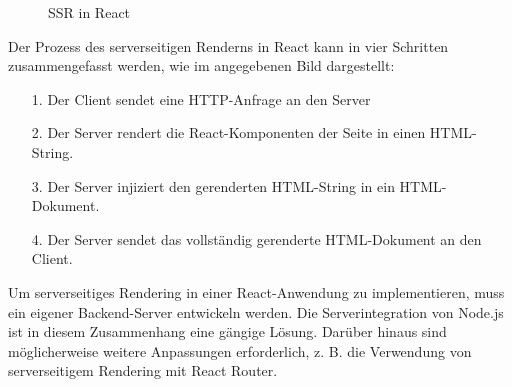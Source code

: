 \begin{figure}[htbp]
	\centering
	\caption{SSR in React}
\end{figure}
Der Prozess des serverseitigen Renderns in React kann in vier Schritten zusammengefasst werden, wie im angegebenen Bild dargestellt:\\
\begin{itemize}
	\item[1.] {Der Client sendet eine HTTP-Anfrage an den Server}
	\item[2.]  {Der Server rendert die React-Komponenten der Seite in einen HTML-String.}
	\item[3.]  {Der Server injiziert den gerenderten HTML-String in ein HTML-Dokument.}
	\item[4.]  {Der Server sendet das vollständig gerenderte HTML-Dokument an den Client.}
\end{itemize}
Um serverseitiges Rendering in einer React-Anwendung zu implementieren, muss ein eigener Backend-Server entwickeln werden. Die Serverintegration von Node.js ist in diesem Zusammenhang eine gängige Lösung. Darüber hinaus sind möglicherweise weitere Anpassungen erforderlich, z. B. die Verwendung von serverseitigem Rendering mit React Router.\cite{Drehmanns2021}\\

